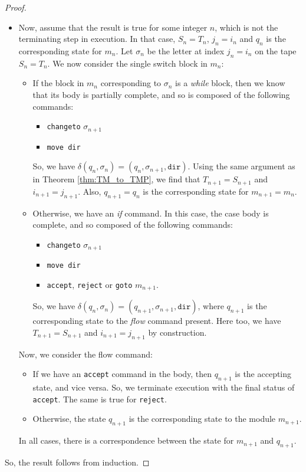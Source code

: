 \begin{appendices}
\begin{proof}
\begin{itemize}
        \item Now, assume that the result is true for some integer $n$, which is not the terminating step in execution. In that case, $S_n = T_n$, $j_n = i_n$ and $q_n$ is the corresponding state for $m_n$. Let $\sigma_n$ be the letter at index $j_n = i_n$ on the tape $S_n = T_n$. We now consider the single switch block in $m_n$:
        \begin{itemize}
            \item If the block in $m_n$ corresponding to $\sigma_n$ is a \textit{while} block, then we know that its body is partially complete, and so is composed of the following commands:
            \begin{itemize}
                \item \texttt{changeto} $\sigma_{n+1}$
                \item \texttt{move dir}
            \end{itemize}
            So, we have $\delta(q_n, \sigma_n) = (q_n, \sigma_{n+1}, \texttt{dir})$. Using the same argument as in Theorem \ref{thm:TM_to_TMP}, we find that $T_{n+1} = S_{n+1}$ and $i_{n+1} = j_{n+1}$. Also, $q_{n+1} = q_n$ is the corresponding state for $m_{n+1} = m_n$. 
            
            \item Otherwise, we have an \textit{if} command. In this case, the case body is complete, and so composed of the following commands:
            \begin{itemize}
                \item \texttt{changeto} $\sigma_{n+1}$
                \item \texttt{move dir}
                \item \texttt{accept}, \texttt{reject} or \texttt{goto} $m_{n+1}$.
            \end{itemize}
            So, we have $\delta(q_n, \sigma_n) = (q_{n+1}, \sigma_{n+1}, \texttt{dir})$, where $q_{n+1}$ is the corresponding state to the \textit{flow} command present. Here too, we have $T_{n+1} = S_{n+1}$ and $i_{n+1} = j_{n+1}$ by construction. 
        \end{itemize}
        Now, we consider the flow command:
        \begin{itemize}
            \item If we have an \texttt{accept} command in the body, then $q_{n+1}$ is the accepting state, and vice versa. So, we terminate execution with the final status of \texttt{accept}. The same is true for \texttt{reject}. 
            \item Otherwise, the state $q_{n+1}$ is the corresponding state to the module $m_{n+1}$.
        \end{itemize}
        In all cases, there is a correspondence between the state for $m_{n+1}$ and $q_{n+1}$.   
    \end{itemize}
    So, the result follows from induction.
\end{proof}


\end{appendices}
